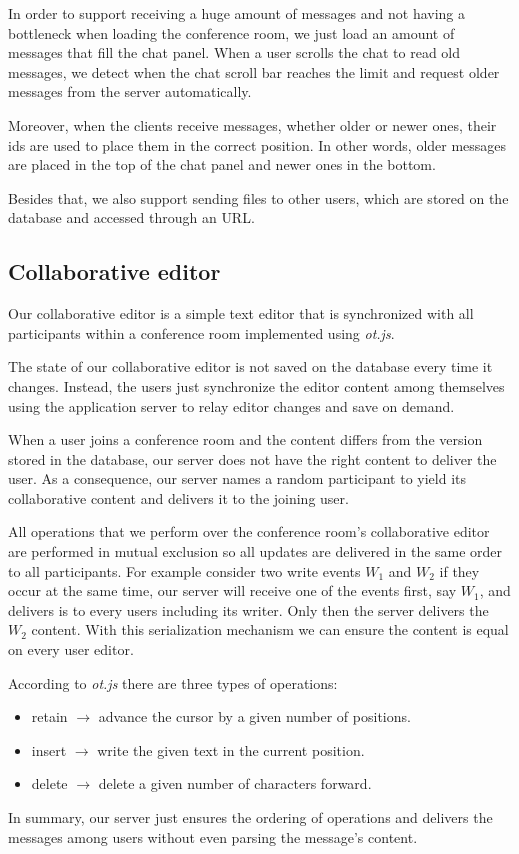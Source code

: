 		In order to support receiving a huge amount of messages and not having a bottleneck when loading the conference room, we just load an amount of messages that fill the chat panel. When a user scrolls the chat to read old messages, we detect when the chat scroll bar reaches the limit and request older messages from the server automatically.

		Moreover, when the clients receive messages, whether older or newer ones, their ids are used to place them in the correct position. In other words, older messages are placed in the top of the chat panel and newer ones in the bottom.

		Besides that, we also support sending files to other users, which are stored on the database and accessed through an \ac{URL}.

\subsection{Collaborative editor}

Our collaborative editor is a simple text editor that is synchronized with all participants within a conference room implemented using \emph{ot.js}.

The state of our collaborative editor is not saved on the database every time it changes. Instead, the users just synchronize the editor content among themselves using the application server to relay editor changes and save on demand.

When a user joins a conference room and the content differs from the version stored in the database, our server does not have the right content to deliver the user. As a consequence, our server names a random participant to yield its collaborative content and delivers it to the joining user.

All operations that we perform over the conference room's collaborative editor are performed in mutual exclusion so all updates are delivered in the same order to all participants. For example consider two write events $W_1$ and $W_2$ if they occur at the same time, our server will receive one of the events first, say $W_1$, and delivers is to every users including its writer. Only then the server delivers the $W_2$ content. With this serialization mechanism we can ensure the content is equal on every user editor.

According to \emph{ot.js} there are three types of operations:
\begin{itemize}
\item{retain} $\rightarrow$ advance the cursor by a given number of positions.
\item{insert} $\rightarrow$ write the given text in the current position.
\item{delete} $\rightarrow$ delete a given number of characters forward.
\end{itemize}

In summary, our server just ensures the ordering of operations and delivers the messages among users without even parsing the message's content.